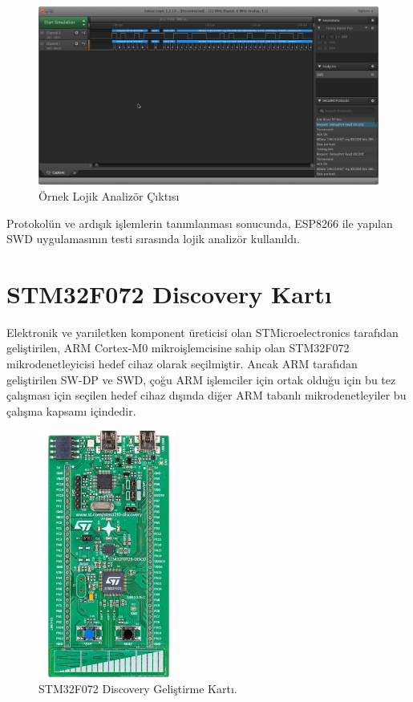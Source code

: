 \begin{figure}[h]
\centering
\includegraphics[width=\textwidth]{gorseller/lojikOut}
\caption{Örnek Lojik Analizör Çıktısı}\label{fig:lojikOut}
\end{figure}


Protokolün ve ardışık işlemlerin tanımlanması sonucunda, ESP8266 ile yapılan SWD uygulamasının testi sırasında lojik analizör kullanıldı.

\section{STM32F072 Discovery Kartı}

Elektronik ve yarıiletken komponent üreticisi olan STMicroelectronics tarafıdan geliştirilen, ARM Cortex-M0 mikroişlemcisine sahip olan STM32F072 mikrodenetleyicisi hedef cihaz olarak seçilmiştir. Ancak ARM tarafıdan geliştirilen SW-DP ve SWD, çoğu ARM işlemciler için ortak olduğu için bu tez çalışması için seçilen hedef cihaz dışında diğer ARM tabanlı mikrodenetleyiler bu çalışma kapsamı içindedir.

\begin{figure}[h]
\centering
\includegraphics[width=0.4\textwidth]{gorseller/stmDisco}
\caption{STM32F072 Discovery Geliştirme Kartı.}\label{fig:stmDisco}
\end{figure}

